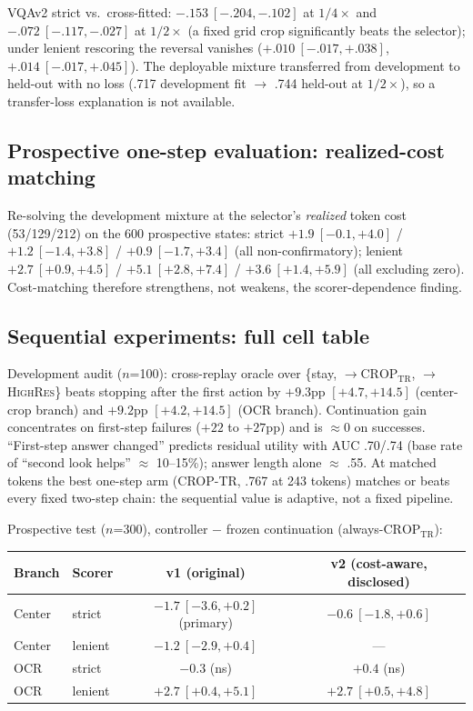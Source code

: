 \documentclass[10pt]{article}
\begin{document}
VQAv2 strict vs.\ cross-fitted: $-.153\ [-.204,-.102]$ at $1/4\times$ and
$-.072\ [-.117,-.027]$ at $1/2\times$ (a fixed grid crop significantly
beats the selector); under lenient rescoring the reversal vanishes
($+.010\ [-.017,+.038]$, $+.014\ [-.017,+.045]$). The deployable mixture
transferred from development to held-out with no loss (.717 development fit
$\to$ .744 held-out at $1/2\times$), so a transfer-loss explanation is not
available.

\subsection{Prospective one-step evaluation: realized-cost matching}

Re-solving the development mixture at the selector's \emph{realized} token
cost (53/129/212) on the 600 prospective states: strict
$+1.9\ [-0.1,+4.0]$ / $+1.2\ [-1.4,+3.8]$ / $+0.9\ [-1.7,+3.4]$ (all
non-confirmatory); lenient $+2.7\ [+0.9,+4.5]$ / $+5.1\ [+2.8,+7.4]$ /
$+3.6\ [+1.4,+5.9]$ (all excluding zero). Cost-matching therefore
strengthens, not weakens, the scorer-dependence finding.

\subsection{Sequential experiments: full cell table}

Development audit ($n$=100): cross-replay oracle over
\{stay, $\to\mathrm{CROP}_{\mathrm{TR}}$, $\to$\textsc{HighRes}\} beats
stopping after the first action by $+9.3$pp $[+4.7,+14.5]$ (center-crop
branch) and $+9.2$pp $[+4.2,+14.5]$ (OCR branch). Continuation gain
concentrates on first-step failures ($+22$ to $+27$pp) and is $\approx$0
on successes. ``First-step answer changed'' predicts residual utility with
AUC .70/.74 (base rate of ``second look helps'' $\approx$ 10--15\%);
answer length alone $\approx$ .55. At matched tokens the best one-step arm
(CROP-TR, .767 at 243 tokens) matches or beats every fixed two-step chain:
the sequential value is adaptive, not a fixed pipeline.

Prospective test ($n$=300), controller $-$ frozen continuation
(always-$\mathrm{CROP}_{\mathrm{TR}}$):

\begin{center}
\small
\begin{tabular}{llcc}
\toprule
Branch & Scorer & v1 (original) & v2 (cost-aware, disclosed) \\
\midrule
Center & strict & $\mathbf{-1.7\ [-3.6,+0.2]}$ (primary) & $-0.6\ [-1.8,+0.6]$ \\
Center & lenient & $-1.2\ [-2.9,+0.4]$ & --- \\
OCR & strict & $-0.3$ (ns) & $+0.4$ (ns) \\
OCR & lenient & $+2.7\ [+0.4,+5.1]$ & $+2.7\ [+0.5,+4.8]$ \\
\bottomrule
\end{tabular}
\end{center}
\end{document}

